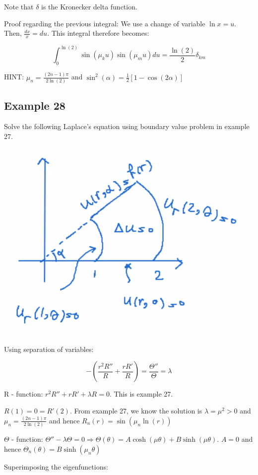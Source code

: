 \documentclass{article}
\begin{document}
Note that $\delta$ is the Kronecker delta function. 

Proof regarding the previous integral: We use a change of variable $\ln x = u$. Then, $\frac{dx}{x} = du$. This integral therefore becomes:

$$\int_0^{\ln(2)} \sin(\mu_k u) \sin(\mu_m u) du = \frac{\ln(2)}{2} \delta_{km}$$

HINT: $\mu_n = \frac{(2n-1) \pi}{2 \ln(2)}$ and $\sin^2 (\alpha) = \frac{1}{2} \left[ 1 - \cos (2 \alpha) \right]$

\subsection{Example 28}

Solve the following Laplace's equation using boundary value problem in example 27. 

\begin{center}
    \includegraphics[width = 0.7 \textwidth]{3.png}
\end{center}

Using separation of variables:

$$- \left( \frac{r^2 R''}{R} + \frac{r R'}{R} \right) = \frac{\Theta''}{\Theta} = \lambda$$

R - function: $r^2 R'' + r R' + \lambda R = 0$. This is example 27. 

$R(1) = 0 = R'(2)$. From example 27, we know the solution is $\lambda = \mu^2 > 0$ and $\mu_n = \frac{(2n-1) \pi}{2 \ln (2)}$ and hence $R_n(r) = \sin \left( \mu_n \ln(r) \right)$

$\Theta$ - function: $\Theta'' - \lambda \Theta = 0 \Rightarrow \Theta(\theta) = A \cosh (\mu \theta) + B \sinh (\mu \theta)$. $A = 0$ and hence $\Theta_n (\theta) = B \sinh (\mu_n \theta)$

Superimposing the eigenfunctions:
\end{document}
